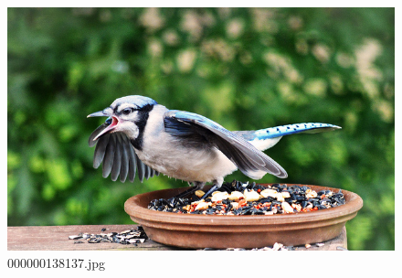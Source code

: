     \begin{figure}[h]
        \centering
        \includegraphics[width=0.8\linewidth]{../image set/easy/000000138137.jpg}
        \caption{000000138137.jpg}
    \end{figure}
